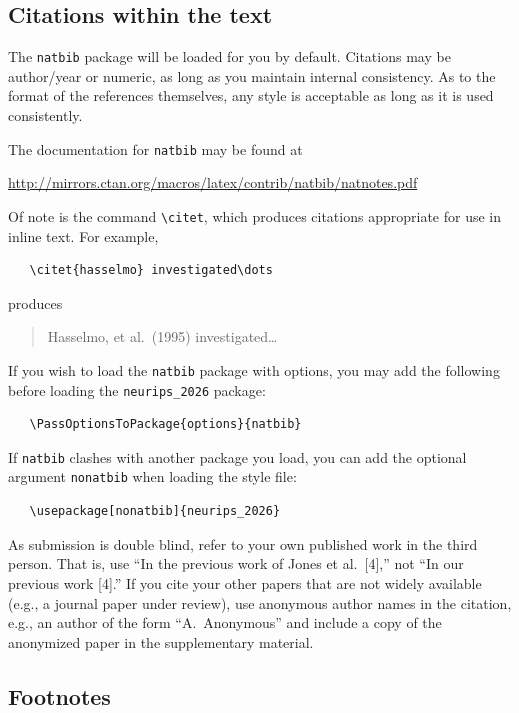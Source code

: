 \documentclass{article}
\begin{document}
\subsection{Citations within the text}


The \verb+natbib+ package will be loaded for you by default.  Citations may be
author/year or numeric, as long as you maintain internal consistency.  As to the
format of the references themselves, any style is acceptable as long as it is
used consistently.


The documentation for \verb+natbib+ may be found at
\begin{center}
  \url{http://mirrors.ctan.org/macros/latex/contrib/natbib/natnotes.pdf}
\end{center}
Of note is the command \verb+\citet+, which produces citations appropriate for
use in inline text.  For example,
\begin{verbatim}
   \citet{hasselmo} investigated\dots
\end{verbatim}
produces
\begin{quote}
  Hasselmo, et al.\ (1995) investigated\dots
\end{quote}


If you wish to load the \verb+natbib+ package with options, you may add the
following before loading the \verb+neurips_2026+ package:
\begin{verbatim}
   \PassOptionsToPackage{options}{natbib}
\end{verbatim}


If \verb+natbib+ clashes with another package you load, you can add the optional
argument \verb+nonatbib+ when loading the style file:
\begin{verbatim}
   \usepackage[nonatbib]{neurips_2026}
\end{verbatim}


As submission is double blind, refer to your own published work in the third
person. That is, use ``In the previous work of Jones et al.\ [4],'' not ``In our
previous work [4].'' If you cite your other papers that are not widely available
(e.g., a journal paper under review), use anonymous author names in the
citation, e.g., an author of the form ``A.\ Anonymous'' and include a copy of the anonymized paper in the supplementary material.


\subsection{Footnotes}
\end{document}
